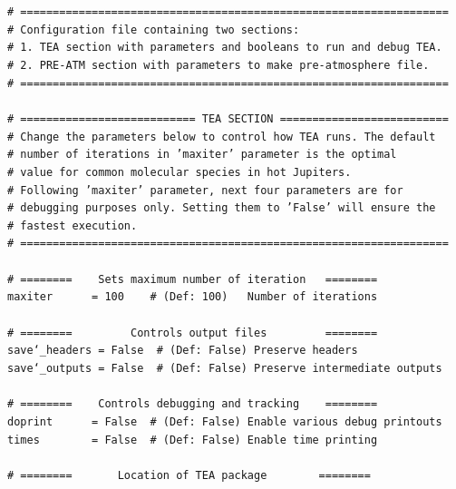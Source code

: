 {\vspace{15pt}
\small   
\noindent \texttt{\#
  ================================================================== \\ \#
  Configuration file containing two sections: \\ \# 1. TEA section
  with parameters and booleans to run and debug TEA.\\ \# 2. PRE-ATM
  section with parameters to make pre-atmosphere file.\\ \#
  ================================================================== \\ \\ \#
  =========================== TEA SECTION
  ========================== \\ \# Change the parameters below to
  control how TEA runs. The default \\ \# number of iterations in
  'maxiter' parameter is the optimal \\ \# value for common molecular
  species in hot Jupiters. \\ \# Following 'maxiter' parameter, next
  four parameters are for \\ \# debugging purposes only. Setting them
  to 'False' will ensure the \\ \# fastest execution.\\ \#
  ================================================================== \\ \\ \#
  ======== ~~~Sets maximum number of iteration ~~======== \\ maxiter
  ~~~~~= 100 ~~~\# (Def:~100) ~~Number of iterations \\ \\ \# ========
  ~~~~~~~~Controls output files ~~~~~~~~======== \\ save\char`_headers
  = False ~\# (Def:~False) Preserve headers \\ save\char`_outputs =
  False ~\# (Def:~False) Preserve intermediate outputs\\ \\ \#
  ======== ~~~Controls debugging and tracking ~~~======== \\ doprint
  ~~~~~= False ~\# (Def:~False) Enable various debug printouts \\
  times ~~~~~~~= False ~\# (Def:~False) Enable time printing \\ \\ \#
  ======== ~~~~~~Location of TEA package ~~~~~~~========\\
}}
